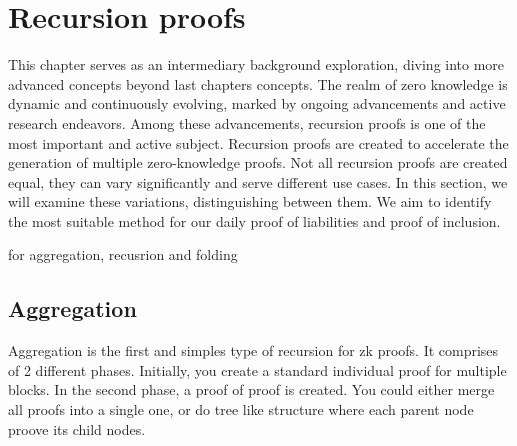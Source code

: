 
\chapter{Recursion proofs}

This chapter serves as an intermediary background exploration, 
diving into more advanced concepts beyond last chapters concepts. 
The realm of zero knowledge is dynamic and continuously evolving, 
marked by ongoing advancements and active research endeavors. Among these advancements, 
recursion proofs is one of the most important and active subject. Recursion proofs are created to accelerate
 the generation of multiple zero-knowledge proofs. 
 Not all recursion proofs are created equal, they can vary significantly and serve different use cases. 
 In this section, we will examine these variations, distinguishing between them. 
 We aim to identify the most suitable method for our daily proof of liabilities and proof of inclusion.


 \cite{Nova23} for aggregation, recusrion and folding

 \section{Aggregation}
 Aggregation is the first and simples type of recursion for zk proofs. It comprises of 2 different phases.
 Initially, you create a standard individual proof for multiple blocks. In the second phase, a proof of proof is created.
 You could either merge all proofs into a single one, or do tree like structure where each parent node proove its child nodes.

